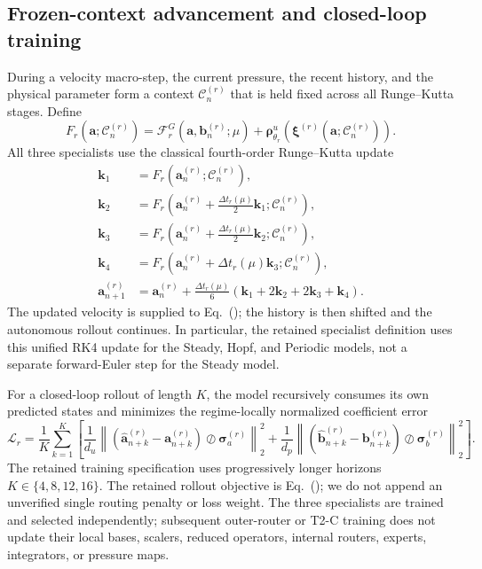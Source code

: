 \subsection{Frozen-context advancement and closed-loop training}

During a velocity macro-step, the current pressure, the recent history, and
the physical parameter form a context $\mathcal C_n^{(r)}$ that is held fixed
across all Runge--Kutta stages. Define
\begin{equation}
  F_r\!\left(\bm a;\mathcal C_n^{(r)}\right)
  =\mathcal F_r^G\!\left(\bm a,\bm b_n^{(r)};\mu\right)
   +\bm\rho^u_{\theta_r}\!\left(
      \bm\xi^{(r)}\!\left(\bm a;\mathcal C_n^{(r)}\right)
    \right).
  \label{eq:app_frozen_context_rhs}
\end{equation}
All three specialists use the classical fourth-order Runge--Kutta update
\begin{align}
  \bm k_1
  &=F_r\!\left(\bm a_n^{(r)};\mathcal C_n^{(r)}\right),\nonumber\\
  \bm k_2
  &=F_r\!\left(
      \bm a_n^{(r)}+\tfrac{\Delta t_r(\mu)}{2}\bm k_1;
      \mathcal C_n^{(r)}
    \right),\nonumber\\
  \bm k_3
  &=F_r\!\left(
      \bm a_n^{(r)}+\tfrac{\Delta t_r(\mu)}{2}\bm k_2;
      \mathcal C_n^{(r)}
    \right),\nonumber\\
  \bm k_4
  &=F_r\!\left(
      \bm a_n^{(r)}+\Delta t_r(\mu)\bm k_3;
      \mathcal C_n^{(r)}
    \right),\nonumber\\
  \bm a_{n+1}^{(r)}
  &=\bm a_n^{(r)}
    +\frac{\Delta t_r(\mu)}{6}
      \left(\bm k_1+2\bm k_2+2\bm k_3+\bm k_4\right).
  \label{eq:app_unified_rk4}
\end{align}
The updated velocity is supplied to
Eq.~(); the history is then shifted and the
autonomous rollout continues. In particular, the retained specialist
definition uses this unified RK4 update for the Steady, Hopf, and Periodic
models, not a separate forward-Euler step for the Steady model.

For a closed-loop rollout of length $K$, the model recursively consumes its
own predicted states and minimizes the regime-locally normalized coefficient
error
\begin{equation}
  \mathcal L_r
  =\frac{1}{K}\sum_{k=1}^{K}\left[
    \frac{1}{d_u}
    \left\|
      \left(\widehat{\bm a}_{n+k}^{(r)}-\bm a_{n+k}^{(r)}\right)
      \oslash\bm\sigma_a^{(r)}
    \right\|_2^2
    +\frac{1}{d_p}
    \left\|
      \left(\widehat{\bm b}_{n+k}^{(r)}-\bm b_{n+k}^{(r)}\right)
      \oslash\bm\sigma_b^{(r)}
    \right\|_2^2
  \right].
  \label{eq:app_true_rollout_loss}
\end{equation}
The retained training specification uses progressively longer horizons
$K\in\{4,8,12,16\}$. The retained rollout objective is
Eq.~(); we do not append an unverified
single routing penalty or loss weight. The three specialists are
trained and selected independently; subsequent outer-router or T2-C training
does not update their local bases, scalers, reduced operators, internal
routers, experts, integrators, or pressure maps.
